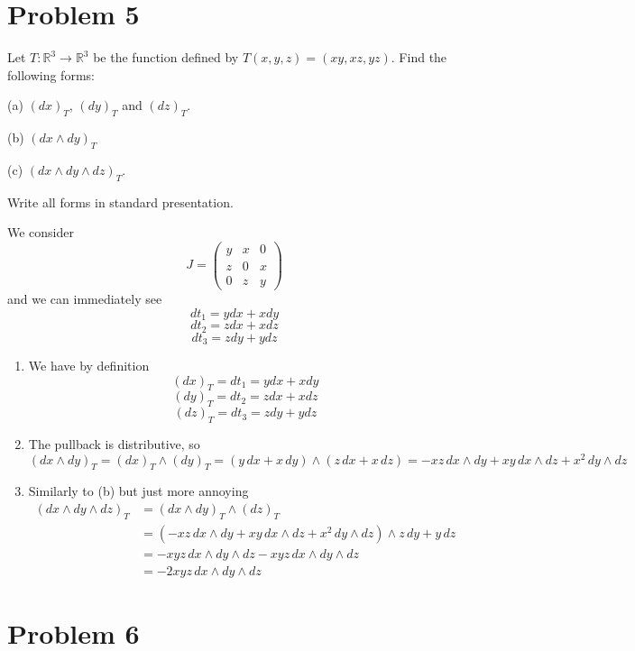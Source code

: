 \documentclass[11pt]{article}
\begin{document}
\section*{Problem 5}

Let $T : \mathbb{R}^3 \to \mathbb{R}^3$ be the function defined by $T (x, y, z) = (xy, xz, yz)$. Find the following forms:

(a) $(dx)_T$, $(dy)_T$ and $(dz)_T$.

(b) $(dx \wedge dy)_T$

(c) $(dx \wedge dy \wedge dz)_T$.

Write all forms in standard presentation.
\begin{solution}
We consider 
\[J = \begin{pmatrix}
    y & x & 0\\
    z & 0 & x\\
    0 & z & y
\end{pmatrix}\] and we can immediately see
\[dt_1 = ydx + xdy\]
\[dt_2 = zdx + xdz\]
\[dt_3 = zdy + ydz\]
    \begin{enumerate}
        \item We have by definition
        \[(dx)_T = dt_1 = ydx + xdy\]
        \[(dy)_T = dt_2 = zdx + xdz\]
        \[(dz)_T = dt_3 = zdy + ydz\]
        \item The pullback is distributive, so
        \[(dx \wedge dy)_T = (dx)_T \wedge (dy)_T = (y\, dx + x\,dy) \wedge (z\,dx + x\,dz) = -xz \,dx \wedge dy + xy\, dx\wedge dz + x^2 \, dy\wedge dz\]
        \item Similarly to (b) but just more annoying
        \begin{align*}
            (dx \wedge dy \wedge dz)_T &= (dx \wedge dy )_T\wedge (dz)_T\\
            &= (-xz \,dx \wedge dy + xy\, dx\wedge dz + x^2 \, dy\wedge dz)\wedge z\,dy + y\,dz\\
            &= -xyz\,dx \wedge dy\wedge dz - xyz\, dx\wedge dy\wedge dz\\
            &= -2xyz\, dx\wedge dy\wedge dz
        \end{align*}
    \end{enumerate}
\end{solution}

\newpage

\section*{Problem 6}
\end{document}
